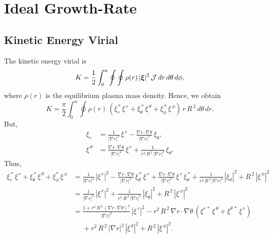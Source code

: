 \documentclass[12pt,prb,aps,notitlepage]{revtex4-1}
\newcommand{\bxi}{\mbox{\boldmath$\xi$}}
\begin{document}
\section{Ideal Growth-Rate}
\subsection{Kinetic Energy Virial}
The kinetic energy virial is 
\begin{equation}
K = \frac{1}{2}\int_0^a\oint\oint \rho(r)\,|\bxi|^2\,{\cal J}\,dr\,d\theta\,d\phi,
\end{equation}
where $\rho(r)$ is the equilibrium plasma mass density. 
Hence, we obtain
\begin{equation}
K= \frac{\pi}{2}\int_0^a\oint \rho(r)\,(\xi_r^{\,\ast}\,\xi^{\,r}+\xi_\theta^{\,\ast}\,\xi^{\,\theta}+\xi_\phi^{\,\ast}\,\xi^{\,\phi})\,r\,R^{\,2}\,d\theta\,dr.
\end{equation}
But,
\begin{align}
\xi_r&= \frac{1}{|\nabla r|^2}\,\xi^{\,r} - \frac{\nabla r\cdot\nabla\theta}{|\nabla r|^2}\,\xi_\theta,\\[0.5ex]
\xi^{\,\theta} & = \frac{\nabla r\cdot\nabla\theta}{|\nabla r|^2}\,\xi^{\,r} + \frac{1}{r^2\,R^{\,2}\,|\nabla r|^2}\,\xi_\theta.
\end{align}
Thus,
\begin{align}
\xi_r^{\,\ast}\,\xi^{\,r}  + \xi_\theta^{\,\ast}\,\xi^{\,\theta} +\xi_\phi^\ast\,\xi^{\,\phi}&= \frac{1}{|\nabla r|^2}\,|\xi^{\,r}|^2 - \frac{\nabla r\cdot\nabla\theta}{|\nabla r|^2}\,\xi_\theta^{\,\ast}\,\xi^{\,r}
+\frac{\nabla r\cdot\nabla\theta}{|\nabla r|^2}\,\xi^{\,r}\,\xi_\theta^{\,\ast}+ \frac{1}{r^2\,R^{\,2}\,|\nabla r|^2}\,|\xi_\theta|^2+R^{\,2}\,|\xi^{\,\phi}|^2\nonumber\\[0.5ex]
&=  \frac{1}{|\nabla r|^2}\,|\xi^{\,r}|^2 + \frac{1}{r^2\,R^{\,2}\,|\nabla r|^2}\,|\xi_\theta|^2+R^{\,2}\,|\xi^{\,\phi}|^2\nonumber\\[0.5ex]
&= \frac{1 + r^2\,R^{\,2}\,(\nabla r\cdot\nabla\theta)^2}{|\nabla r|^2}\,|\xi^{\,r}|^2-r^2\,R^{\,2}\,\nabla r\cdot\nabla\theta\,(\xi^{r\,\ast}\,\xi^{\,\theta}+
\xi^{\theta\,\ast}\,\xi^{\,r})\nonumber\\[0.5ex]
&\phantom{=} + r^2\,R^{\,2}\,|\nabla r|^2\,|\xi^{\,\theta}|^2+R^{\,2}\,|\xi^{\,\phi}|^2.
\end{align}
\end{document}
